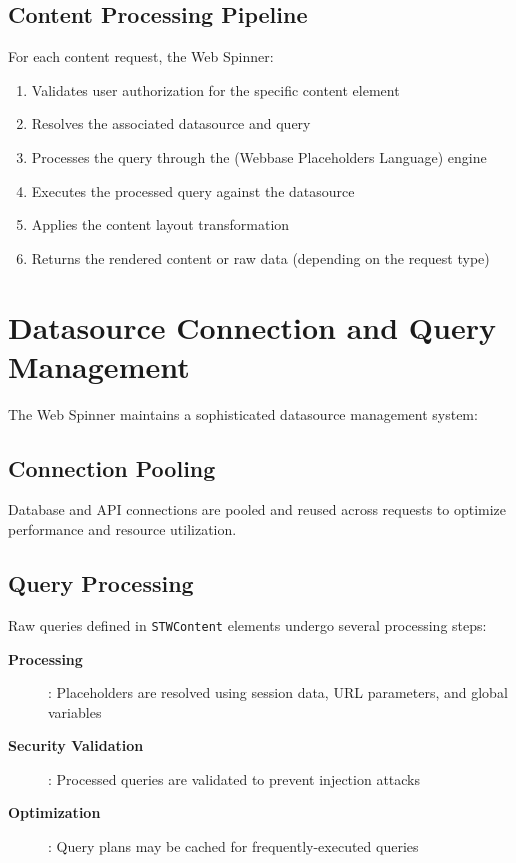 \subsection{Content Processing Pipeline}

For each content request, the Web Spinner:
\begin{enumerate}
    \item Validates user authorization for the specific content element
    \item Resolves the associated datasource and query
    \item Processes the query through the \wbpl{} (Webbase Placeholders Language) engine
    \item Executes the processed query against the datasource
    \item Applies the content layout transformation
    \item Returns the rendered content or raw data (depending on the request type)
\end{enumerate}

\section{Datasource Connection and Query Management}
\label{sec:datasource-management}

The Web Spinner maintains a sophisticated datasource management system:

\subsection{Connection Pooling}

Database and API connections are pooled and reused across requests to optimize performance and resource utilization.

\subsection{Query Processing}

Raw queries defined in \texttt{STWContent} elements undergo several processing steps:
\begin{description}
    \item[\textbf{\wbpl{} Processing}]: Placeholders are resolved using session data, URL parameters, and global variables
    \item[\textbf{Security Validation}]: Processed queries are validated to prevent injection attacks
    \item[\textbf{Optimization}]: Query plans may be cached for frequently-executed queries
\end{description}

